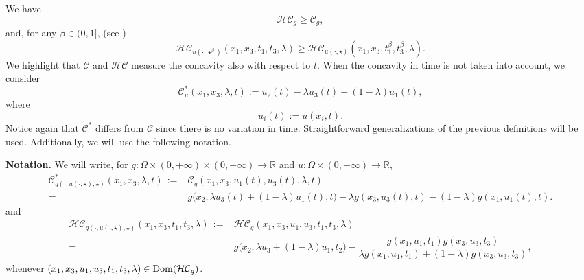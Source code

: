\documentclass[11pt, reqno]{amsart}
\theoremstyle{definition}
\numberwithin{equation}{section}
\newcommand{\R}{\mathbb{R}}
\newcommand{\mc}[1]{\mathcal{#1}}
\newcommand{\Dom}{{\rm Dom}}
\begin{document}
We have \cite[page 4]{BuSq19}
\begin{equation}\label{eq_hc_grt_c}
	\mc{HC}_g \geq \mc{C}_g,
\end{equation}
and, for any $\beta \in (0,1]$, (see \cite[equation (2.2)]{IsSa13})
\begin{equation}\label{eq_harmonic_beta}
	\mc{HC}_{u(\cdot, \star^{\beta})}(x_1, x_3, t_1,t_3,\lambda) \geq \mc{HC}_{u(\cdot, \star)}(x_1, x_3,t_1^{\beta},t_3^{\beta},\lambda).
\end{equation}
We highlight that $\mc{C}$ and $\mc{HC}$ measure the concavity also with respect to $t$. When the concavity in time is not taken into account, we consider 
\[ \mathcal{C}^*_u(x_1,x_3,\lambda, t):=u_2(t)-\lambda u_3(t)-(1-\lambda)u_1(t), \] 
where
$$u_i(t):= u(x_i,t).$$
Notice again that $\mc{C}^*$ differs from $\mc{C}$ since there is no variation in time. Straightforward generalizations of the previous definitions will be used.
Additionally, we will use the following notation.

\smallskip

\textbf{Notation.} We will write, for $g\colon\Omega\times (0,+\infty)\times (0,+\infty)\to \R$ and $u\colon\Omega\times(0,+\infty)\to \R$, 
\begin{align*}
\mc{C}^*_{g(\cdot, u(\cdot,\star), \star)}(x_1,x_3,\lambda,t) \, :=&  \mc{C}_{g}(x_1, x_3, u_1(t), u_3(t), \lambda,t) \\ 
=& g \big(x_2,\lambda u_3(t)+(1-\lambda)u_1(t),t\big) - \lambda g(x_3, u_3(t),t) - (1-\lambda) g(x_1, u_1(t),t). 
\end{align*}
and
\begin{align*}
\mathcal{HC}_{g(\cdot, u(\cdot,\star), \star)}(x_1,x_3,t_1,t_3,\lambda) \, :=& \mathcal{HC}_g(x_1, x_3, u_1, u_3, t_1, t_3, \lambda) \\
=&g\big(x_2,\lambda u_3+(1-\lambda)u_1, t_2\big)-\dfrac{g(x_1,u_1, t_1)g(x_3,u_3,t_3)}{\lambda g(x_1,u_1,t_1)+(1-\lambda)g(x_3,u_3,t_3)},
\end{align*}
whenever $(x_1, x_3, u_1, u_3, t_1, t_3, \lambda) \in \Dom(\mc{HC}_g)$.
\end{document}
